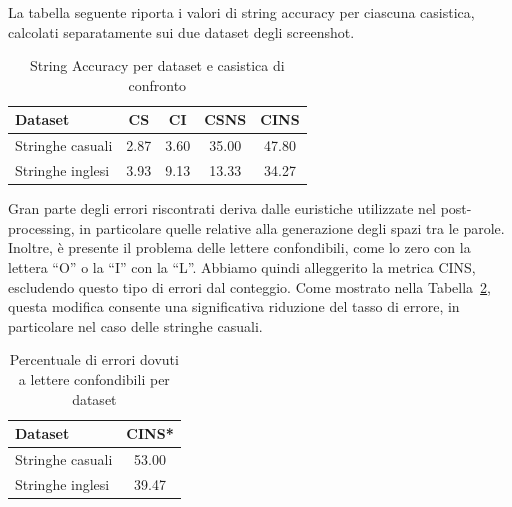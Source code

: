 La tabella seguente riporta i valori di string accuracy per ciascuna casistica, calcolati separatamente sui due dataset degli screenshot.

\begin{table}[htbp]
    \centering
    \begin{tabular}{lcccc}
        \toprule
        Dataset & CS & CI & CSNS & CINS \\
        \midrule
        Stringhe casuali & 2.87 & 3.60 & 35.00 & 47.80 \\
        Stringhe inglesi & 3.93 & 9.13 & 13.33 & 34.27 \\
        \bottomrule
    \end{tabular}
    \caption{String Accuracy per dataset e casistica di confronto}
    \label{tab:string_accuracy_stats}
\end{table}

Gran parte degli errori riscontrati deriva dalle euristiche utilizzate nel post-processing, in particolare quelle relative alla generazione degli spazi tra le parole.  
Inoltre, è presente il problema delle lettere confondibili, come lo zero con la lettera “O” o la “I” con la “L”.  
Abbiamo quindi alleggerito la metrica CINS, escludendo questo tipo di errori dal conteggio.  
Come mostrato nella Tabella~\ref{tab:error_rates}, questa modifica consente una significativa riduzione del tasso di errore, in particolare nel caso delle stringhe casuali.

\begin{table}[htbp]
    \centering
    \begin{tabular}{lc}
        \toprule
        Dataset & CINS* \\
        \midrule
        Stringhe casuali & 53.00 \\
        Stringhe inglesi & 39.47 \\
        \bottomrule
    \end{tabular}
    \caption{Percentuale di errori dovuti a lettere confondibili per dataset}
    \label{tab:error_rates}
\end{table}